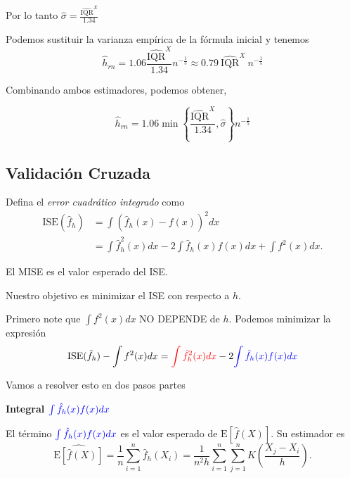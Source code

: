 \documentclass[
  12pt,
]{book}
\theoremstyle{definition}
\theoremstyle{definition}
\theoremstyle{definition}
\theoremstyle{remark}
\let\BeginKnitrBlock\begin \let\EndKnitrBlock\end
\begin{document}
Por lo tanto \(\displaystyle \hat{\sigma} = \frac{\widehat{\mathrm{IQR}}^{X}}{1.34}\)

Podemos sustituir la varianza empírica de la fórmula inicial y tenemos
\begin{equation*}
\hat{h}_{rn} = 1.06 \frac{\widehat{\mathrm{IQR}}^{X}}{1.34} n^{-\frac{1}{5}} \approx 0.79\  \widehat{\mathrm{IQR}}^{X}\ n^{-\frac{1}{5}}
\end{equation*}

Combinando ambos estimadores, podemos obtener,

\begin{equation*}
\hat{h}_{rn} = 1.06 \min \left\{\frac{\widehat{\mathrm{IQR}}^{X}}{1.34}, \hat{\sigma }\right\} n^{-\frac{1}{5}}
\end{equation*}

\hypertarget{validaciuxf3n-cruzada}{%
\subsection{Validación Cruzada}\label{validaciuxf3n-cruzada}}

Defina el \emph{error cuadrático integrado} como
\begin{align*}
\mathrm{ISE}(\hat{f}_{h}) & =\int\left(\hat{f}_{h}(x)-f(x)\right)^{2}dx\nonumber                   \\
& =\int \hat{f}_{h}^{2}(x)dx-2\int \hat{f}_{h}(x)f(x)dx+\int f^{2}(x)dx.
\end{align*}

\BeginKnitrBlock{remark}
{}El MISE es el valor esperado del ISE.
\EndKnitrBlock{remark}

Nuestro objetivo es minimizar el ISE con respecto a \(h\).

Primero note que \(\int f^{2}(x)dx\) NO DEPENDE de \(h\). Podemos minimizar la expresión
\begin{equation*}
\mathrm{ISE}(\hat{f}_{h})-\int f^{2}(x)dx=
\textcolor{red}{\int\hat{f}_{h}^{2}(x)dx}
-2
\textcolor{blue}{\int\hat{f}_{h}(x)f(x)dx}
\end{equation*}

Vamos a resolver esto en dos pasos partes

\textbf{Integral \(\textcolor{blue}{\int\hat{f}_{h}(x)f(x)dx}\)}

El término \(\textcolor{blue}{\int\hat{f}_{h}(x)f(x)dx}\) es el valor esperado de
\(\mathrm{E}\left[\hat{f}(X)\right]\). Su estimador es
\begin{equation*}
\widehat{\mathrm{E}\left[\hat{f}(X)\right]}
= \frac{1}{n}\sum_{i=1}^{n}\hat{f}_{h}(X_{i})
=\frac{1}{n^{2}h}\sum_{i=1}^{n}\sum_{j=1}^{n}
K\left(\frac{X_{j}-X_{i}}{h}\right).
\end{equation*}
\end{document}
